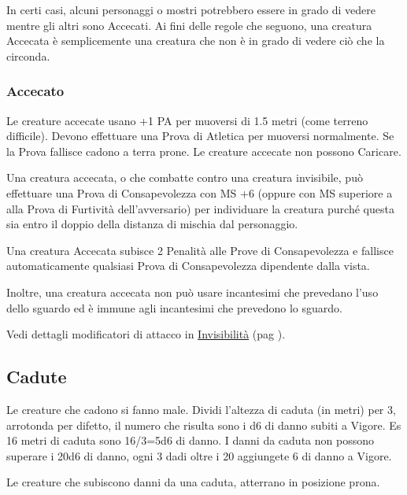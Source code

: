 \documentclass[12pt,a4paper,twoside,openany]{book}
\begin{document}
\begin{multicols}{2}
In certi casi, alcuni personaggi o mostri potrebbero essere in grado di vedere mentre gli altri sono Accecati. Ai fini delle regole che seguono, una creatura Accecata è semplicemente una creatura che non è in grado di vedere ciò che la circonda.

\subsubsection{Accecato}

\label{accecato}

Le creature accecate usano +1 PA per muoversi di 1.5 metri (come terreno difficile). Devono effettuare una Prova di Atletica per muoversi normalmente. Se la Prova fallisce cadono a terra prone. Le creature accecate non possono Caricare.

Una creatura accecata, o che combatte contro una creatura invisibile, può effettuare una Prova di Consapevolezza con MS +6 (oppure con MS superiore a alla Prova di Furtività dell'avversario) per individuare la creatura purché questa sia entro il doppio della distanza di mischia dal personaggio.

Una creatura Accecata  subisce 2 Penalità alle Prove di Consapevolezza e fallisce automaticamente qualsiasi Prova di Consapevolezza dipendente dalla vista.

Inoltre, una creatura accecata non può usare incantesimi che prevedano l'uso dello sguardo ed è immune agli incantesimi che prevedono lo sguardo.

Vedi dettagli modificatori di attacco in \hyperlink{invisibilita}{Invisibilità} (pag \pageref{invisibilita}).

\subsection{Cadute}\hypertarget{cadute}{}

\label{cadute}

Le creature che cadono si fanno male. Dividi l'altezza di caduta (in metri) per 3, arrotonda per difetto, il numero che risulta sono i d6 di danno subiti a Vigore. Es 16 metri di caduta sono 16/3=5d6 di danno. I danni da caduta non possono superare i 20d6 di danno, ogni 3 dadi oltre i 20 aggiungete 6 di danno a Vigore.

Le creature che subiscono danni da una caduta, atterrano in posizione prona.


\end{multicols}
\end{document}
